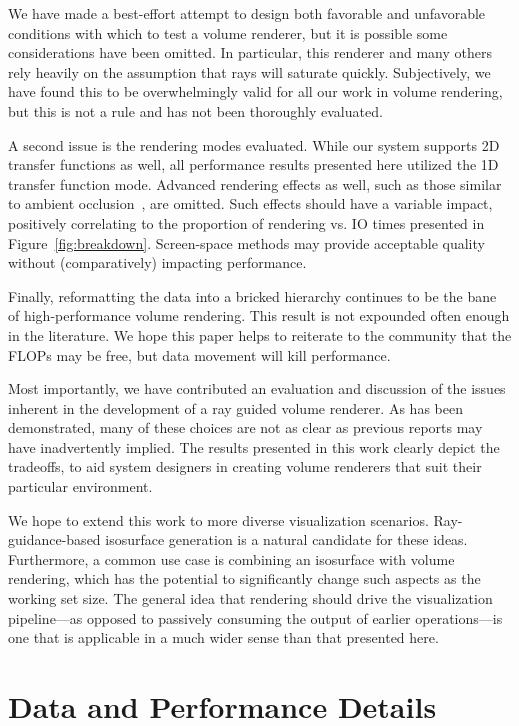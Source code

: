 We have made a best-effort attempt to design both favorable and
unfavorable conditions with which to test a volume renderer, but it
is possible some considerations have been omitted.  In particular,
this renderer and many others rely heavily on the assumption that
rays will saturate quickly.  Subjectively, we have found this to be
overwhelmingly valid for all our work in volume rendering, but this is
not a rule and has not been thoroughly evaluated.

A second issue is the rendering modes evaluated.  While our system
supports 2D transfer functions as well, all performance results
presented here utilized the 1D transfer function mode.  Advanced
rendering effects as well, such as those similar to ambient
occlusion~\cite{Schott:2009:DAOVR}, are omitted.  Such effects should
have a variable impact, positively correlating to the proportion of
rendering vs. IO times presented in
Figure~\ref{fig:breakdown}.  Screen-space methods may provide
acceptable quality without (comparatively) impacting performance.

Finally, reformatting the data into a bricked hierarchy continues to
be the bane of high-performance volume rendering.  This result is not
expounded often enough in the literature.  We hope this paper helps
to reiterate to the community that the FLOPs may be free, but data
movement will kill performance.

Most importantly, we have contributed an evaluation and discussion
of the issues inherent in the development of a ray guided volume
renderer. As has been demonstrated, many of these choices are not as
clear as previous reports may have inadvertently implied.  The results
presented in this work clearly depict the tradeoffs, to aid system
designers in creating volume renderers that suit their particular
environment.

We hope to extend this work to more diverse visualization scenarios.
Ray-guidance-based isosurface generation is a natural candidate for
these ideas.  Furthermore, a common use case is combining an isosurface
with volume rendering, which has the potential to significantly change
such aspects as the working set size.  The general idea that rendering
should drive the visualization pipeline---as opposed to passively
consuming the output of earlier operations---is one that is applicable
in a much wider sense than that presented here.

\section{Data and Performance Details}
\label{sec:data}

